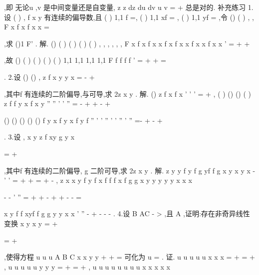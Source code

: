 ,即 
无论u ,v 是中间变量还是自变量,
z
z
dz
du
dv
u
v
\partial 
\partial 
=
+
\partial 
\partial 
总是对的. 
\textcolor{lyred}{补充练习 }
1.设
(
)
,
f x y 有连续的偏导数,且
(
)
1,1
f
=,
(
)
1,1
xf
=
,
(
)
1,1
yf
=
,令 
()
(
)
,
,
F x
f
x f x x
=



,求
()1
F'
. 
解.
()
(
)
(
)
(
)
(
)
,
,
,
,
,
,
F
x
f
x f x x
f
x f x x
f
x x
f
x x
'
=
+
+









,故 
()
(
)
(
)
(
)
(
)
1,1
1,1
1,1
1,1
F
f
f
f
f
'
=
+
+
=




. 
2.设
()
()
,
z
f
x
y
y
x
\varphi 
\zeta 
=
-
+



,其中f 有连续的二阶偏导,\varphi 与\zeta 可导,求
2z
x y
\partial 
\partial \partial . 
解.
()
z
f
x
f
x
\varphi 
\partial 
'
'
'
=
\cdots 
+
\partial 
,
(
)
()
()
(
)
z
f
f
y
x
f
x y
\zeta 
\varphi 
\partial 
''
''
'
'
''
=
\cdots -
+
\cdots 
+
\cdots -
+




\partial \partial 
()
()
()
()
()
f
y
x f
y
x
f
y f
\zeta 
\varphi 
\zeta 
\varphi 
\zeta 
''
'
'
''
'
'
''
'
''
\cdots 
=-
+
-
+




. 
3.设
, x
y
z
f
xy
g
y
x




=
+








,其中f 有连续的二阶偏导, g 二阶可导,求
2z
x y
\partial 
\partial \partial . 
解.
z
y
y
f
y
f
g
yf
f
g
x
y
x
y
x
\partial 
-
'
'
=
\cdots 
+
\cdots 
+
\cdots 
=
+
-
\partial 
, 
z
x
x
y
f
y
f
x
f
f
f
x
f
g
g
x y
y
y
y
y
x
x
x




\partial 
-
-
'
''
=
+
\cdots +
\cdots 
-
+
\cdots +
\cdots 
-
-
\cdots 
=




\partial \partial 




x
y
f
f
xyf
f
g
g
y
y
x
x
'
''
-
+
-
-
-
. 
4.设
B
AC
-
>
,且
A \neq 
,证明:存在非奇异线性变换
x
y
x
y
\psi 
\lambda 
\eta 
\mu 
=
+


=
+

,使得方程 
u
u
u
A
B
C
x
x y
y
\partial 
\partial 
\partial 
+
+
=
\partial 
\partial \partial 
\partial 
可化为
u
\psi \eta 
\partial 
=
\partial \partial 
. 
证. u
u
u
u
u
x
x
x
\psi 
\eta 
\lambda 
\mu 
\psi 
\eta 
\psi 
\eta 
\partial 
\partial 
\partial 
\partial 
\partial 
\partial 
\partial 
=
+
=
+
\partial 
\partial 
\partial 
\partial 
\partial 
\partial 
\partial 
, u
u
u
u
u
y
y
y
\psi 
\eta 
\psi 
\eta 
\psi 
\eta 
\partial 
\partial 
\partial 
\partial 
\partial 
\partial 
\partial 
=
+
=
+
\partial 
\partial 
\partial 
\partial 
\partial 
\partial 
\partial 
, 
u
u
u
u
u
u
u
u
x
x
x
x
x
\psi 
\eta 
\psi 
\eta 
\lambda 
\mu 
\lambda 
\lambda \mu 
\mu 
\psi 
\psi \eta 
\eta \psi 
\eta 
\psi 
\psi \eta 
\eta 




